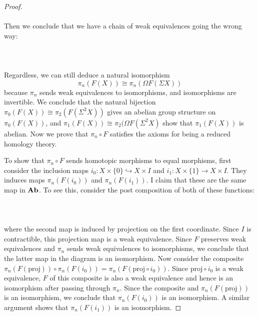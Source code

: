 \begin{thm}
\begin{proof}
{} \\~\\
Then we conclude that we have a chain of weak equivalences going the wrong way:  
 \\~\\  \\~\\
Regardless, we can still deduce a natural isomorphism $$\pi_n(F(X))\cong\pi_n(\Omega F(\Sigma X))$$ because $\pi_n$ sends weak equivalences to isomorphisms, and isomorphisms are invertible. We conclude that the natural bijection $\pi_0(F(X))\cong\pi_2(F(\Sigma^2 X))$ gives an abelian group structure on $\pi_0(F(X))$, and $\pi_1(F(X))\cong\pi_2(\Omega F(\Sigma^2 X)$ show that $\pi_1(F(X))$ is abelian. Now we prove that $\pi_n\circ F$ satisfies the axioms for being a reduced homology theory. 

To show that $\pi_n\circ F$ sends homotopic morphisms to equal morphisms, first consider the inclusion maps $i_0:X\times\{0\}\hookrightarrow X\times I$ and $i_1:X\times\{1\}\to X\times I$. They induces maps $\pi_n(F(i_0))$ and $\pi_n(F(i_1))$. I claim that these are the same map in $\bold{Ab}$. To see this, consider the post composition of both of these functions:  
 \\~\\  \\~\\
where the second map is induced by projection on the first coordinate. Since $I$ is contractible, this projection map is a weak equivalence. Since $F$ preserves weak equivalences and $\pi_n$ sends weak equivalences to isomorphisms, we conclude that the latter map in the diagram is an isomorphism. Now consider the composite $\pi_n(F(\text{proj}))\circ\pi_n(F(i_0))=\pi_n(F(\text{proj}\circ i_0))$. Since $\text{proj}\circ i_0$ is a weak equivalence, $F$ of this composite is also a weak equivalence and hence is an isomorphism after passing through $\pi_n$. Since the composite and $\pi_n(F(\text{proj}))$ is an isomorphism, we conclude that $\pi_n(F(i_0))$ is an isomorphism. A similar argument shows that $\pi_n(F(i_1))$ is an isomorphism. 


\end{proof}
\end{thm}
